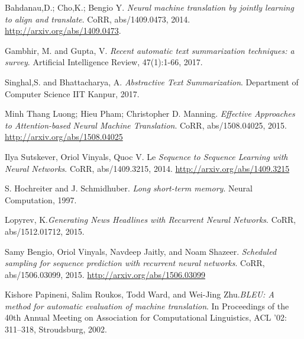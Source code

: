 \begin{thebibliography}{9}
	Bahdanau,D.; Cho,K.; Bengio Y. \textit{Neural machine translation by jointly learning to align and translate}. CoRR, abs/1409.0473, 2014. \url{ http://arxiv.org/abs/1409.0473}.
	
	Gambhir, M. and Gupta, V. \textit{Recent automatic text summarization techniques: a survey}. Artificial Intelligence Review, 47(1):1-66, 2017.
	
	Singhal,S. and Bhattacharya, A. \textit{Abstractive Text Summarization}. Department of Computer Science IIT Kanpur, 2017.
	
	Minh Thang Luong; Hieu Pham; Christopher D. Manning. \textit{Effective Approaches to Attention-based Neural Machine Translation}. CoRR, abs/1508.04025, 2015. \url{http://arxiv.org/abs/1508.04025}
	
	Ilya Sutskever, Oriol Vinyals, Quoc V. Le \textit{Sequence to Sequence Learning with Neural Networks}. CoRR, abs/1409.3215, 2014. \url{http://arxiv.org/abs/1409.3215}
	
	S. Hochreiter and J. Schmidhuber. \textit{Long short-term memory}. Neural Computation, 1997.
		 
	Lopyrev, K.\textit{Generating News Headlines with Recurrent Neural 	Networks}. CoRR, abs/1512.01712, 2015.
	
	Samy Bengio, Oriol Vinyals, Navdeep Jaitly, and Noam Shazeer. \textit{Scheduled sampling for sequence
prediction with recurrent neural networks}. CoRR, abs/1506.03099, 2015. \url{http://arxiv.org/abs/1506.03099}

Kishore Papineni, Salim Roukos, Todd Ward, and Wei-Jing Zhu.\textit{BLEU: A method for automatic evaluation of machine translation}. In Proceedings of the 40th Annual Meeting on Association for Computational Linguistics, ACL ’02: 311–318, Stroudsburg, 2002. 
	
	

\end{thebibliography}


